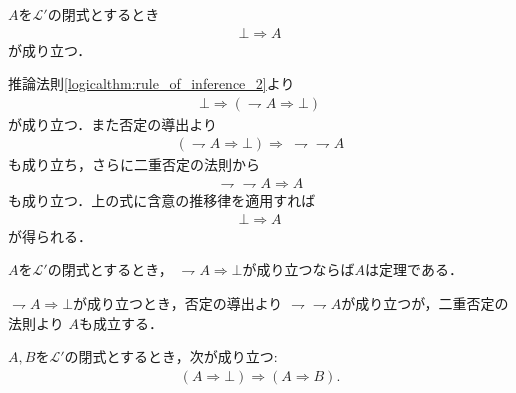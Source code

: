 	\begin{screen}
		\begin{logicalthm}[矛盾からはあらゆる式が導かれる]\label{logicalthm:contradiction_derives_any_formula}
			$A$を$\mathcal{L}'$の閉式とするとき
			\begin{align}
				\bot \Longrightarrow A
			\end{align}
			が成り立つ．
		\end{logicalthm}
	\end{screen}
	
	\begin{prf}
		推論法則\ref{logicalthm:rule_of_inference_2}より
		\begin{align}
			\bot \Longrightarrow (\rightharpoondown A \Longrightarrow \bot)
		\end{align}
		が成り立つ．また否定の導出より
		\begin{align}
			(\rightharpoondown A \Longrightarrow \bot) \Longrightarrow\ \rightharpoondown \rightharpoondown A
		\end{align}
		も成り立ち，さらに二重否定の法則から
		\begin{align}
			\rightharpoondown \rightharpoondown A \Longrightarrow A
		\end{align}
		も成り立つ．上の式に含意の推移律を適用すれば
		\begin{align}
			\bot \Longrightarrow A
		\end{align}
		が得られる．
		\QED
	\end{prf}
	
	\begin{screen}
		\begin{logicalthm}[背理法の原理]
			$A$を$\mathcal{L}'$の閉式とするとき，
			$\rightharpoondown A \Longrightarrow \bot$が成り立つならば$A$は定理である．
		\end{logicalthm}
	\end{screen}
	
	\begin{prf}
		$\rightharpoondown A \Longrightarrow \bot$が成り立つとき，否定の導出より
		$\rightharpoondown \rightharpoondown A$が成り立つが，二重否定の法則より
		$A$も成立する．
		\QED
	\end{prf}
	
	\begin{screen}
		\begin{logicalthm}[矛盾を導く式はあらゆる式を導く]\label{logicalthm:formula_leading_to_contradiction_derives_any_formula}
			$A,B$を$\mathcal{L}'$の閉式とするとき，次が成り立つ:
			\begin{align}
				(A \Longrightarrow \bot) \Longrightarrow (A \Longrightarrow B).
			\end{align}
		\end{logicalthm}
	\end{screen}
	
